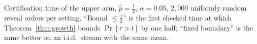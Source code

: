\begin{table}[t]
\centering\small
\caption{Certification time of the upper arm, $\hat p=\frac12$, $\alpha=0.05$,
$2{,}000$ uniformly random reveal orders per setting. ``Bound $\le\frac12$'' is the first
checked time at which Theorem~\ref{thm:growth} bounds $\Pr[\tau>t]$ by one half;
``fixed boundary'' is the same bettor on an i.i.d.\ stream with the same mean.}
\label{tab:growth}
\resizebox{\columnwidth}{!}{}
\end{table}
